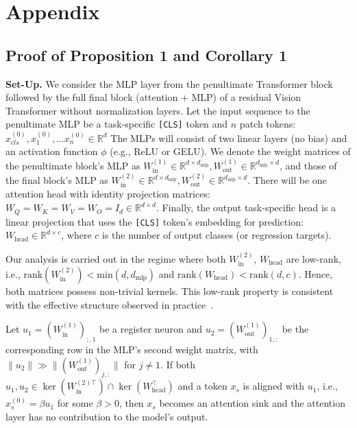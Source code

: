 \documentclass{article}
\begin{document}
\newpage
\appendix
\section{Appendix}

\subsection{Proof of Proposition 1 and Corollary 1}
\label{appendix:proof}

\textbf{Set-Up.}
We consider the MLP layer from the penultimate Transformer block followed by the full final block (attention + MLP) of a residual Vision Transformer without normalization layers. Let the input sequence to the penultimate MLP be a task-specific \texttt{[CLS]} token and $n$ patch tokens: $x^{(0)}_{cls}, x^{(0)}_1,...  x^{(0)}_n\in \mathbb{R}^{d}$ The MLPs will consist of two linear layers (no bias) and an activation function \( \phi \) (e.g., ReLU or GELU). We denote the weight matrices of the penultimate block's MLP as $W_{\text{in}}^{(1)} \in \mathbb{R}^{d \times d_{\text{mlp}}}, W_{\text{out}}^{(1)} \in \mathbb{R}^{d_{\text{mlp}} \times d}$, and those of the final block's MLP as $W_{\text{in}}^{(2)} \in \mathbb{R}^{d \times d_{\text{mlp}}}, W_{\text{out}}^{(2)} \in \mathbb{R}^{d_{\text{mlp}} \times d}$. There will be one attention head with identity projection matrices: \( W_Q = W_K = W_V = W_O = I_d \in \mathbb{R}^{d \times d} \). Finally, the output task-specific head is a linear projection that uses the \texttt{[CLS]} token's embedding for prediction: $W_{\text{head}} \in \mathbb{R}^{d \times c}$,  where \( c \) is the number of output classes (or regression targets). 

Our analysis is carried out in the regime where both $W_{\text{in}}^{(2)}$, $W_{\text{head}}$  are low-rank, i.e., $\mathrm{rank}(W_{\text{in}}^{(2)})< \mathrm{min}(d,d_{\text{mlp}})$ and
$\mathrm{rank}(W_{\text{head}})< \mathrm{rank}(d,c)$. Hence, both matrices possess non-trivial kernels. This low-rank property is consistent with the effective structure observed in practice~\citep{li2018measuring, aghajanyan2021intrinsic, hulora}.


\begingroup
\renewcommand\theproposition{1} \begin{proposition}
\label{prop:register_sink}
Let $u_1 = (W_{\text{in}}^{(1)})_{:, 1}$
be a register neuron and $u_2 = (W_{\text{out}}^{(1)})_{1, :}$
be the corresponding row in the MLP's second weight matrix, with $\|u_2\|
 \gg\|(W_{\text{out}}^{(1)})_{j,:}\|$ for $j \neq 1$.
If both $u_1, u_2 \in \ker(W_{\text{in}}^{(2)\top}) \cap \ker(W^\top_{\text{head}})$ and a token $x_s$ is aligned with $u_1$, i.e., $x^{(0)}_s = \beta u_1$ for some $\beta > 0$,
then $x_s$ becomes an attention sink and the attention layer has no contribution to the model's output.
\end{proposition}
\endgroup
\end{document}
